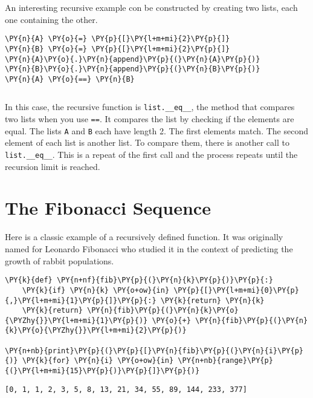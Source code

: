 An interesting recursive example con be constructed by creating two lists, each one containing the other.


\begin{Verbatim}[commandchars=\\\{\}]
\PY{n}{A} \PY{o}{=} \PY{p}{[}\PY{l+m+mi}{2}\PY{p}{]}
\PY{n}{B} \PY{o}{=} \PY{p}{[}\PY{l+m+mi}{2}\PY{p}{]}
\PY{n}{A}\PY{o}{.}\PY{n}{append}\PY{p}{(}\PY{n}{A}\PY{p}{)}
\PY{n}{B}\PY{o}{.}\PY{n}{append}\PY{p}{(}\PY{n}{B}\PY{p}{)}
\PY{n}{A} \PY{o}{==} \PY{n}{B}
\end{Verbatim}

\begin{Verbatim}
\end{Verbatim}


In this case, the recursive function is \texttt{list.\_\_eq\_\_}, the method that compares two lists when you use \texttt{==}.  It compares the list by checking if the elements are equal.  The lists \texttt{A} and \texttt{B} each have length 2.  The first elements match.  The second element of each list is another list.  To compare them, there is another call to \texttt{list.\_\_eq\_\_}.  This is a repeat of the first call and the process repeats until the recursion limit is reached.

\section{The Fibonacci Sequence}


Here is a classic example of a recursively defined function.
It was originally named for Leonardo Fibonacci who studied it in the context of predicting the growth of rabbit populations.


\begin{Verbatim}[commandchars=\\\{\}]
\PY{k}{def} \PY{n+nf}{fib}\PY{p}{(}\PY{n}{k}\PY{p}{)}\PY{p}{:}
    \PY{k}{if} \PY{n}{k} \PY{o+ow}{in} \PY{p}{[}\PY{l+m+mi}{0}\PY{p}{,}\PY{l+m+mi}{1}\PY{p}{]}\PY{p}{:} \PY{k}{return} \PY{n}{k}
    \PY{k}{return} \PY{n}{fib}\PY{p}{(}\PY{n}{k}\PY{o}{\PYZhy{}}\PY{l+m+mi}{1}\PY{p}{)} \PY{o}{+} \PY{n}{fib}\PY{p}{(}\PY{n}{k}\PY{o}{\PYZhy{}}\PY{l+m+mi}{2}\PY{p}{)}

\PY{n+nb}{print}\PY{p}{(}\PY{p}{[}\PY{n}{fib}\PY{p}{(}\PY{n}{i}\PY{p}{)} \PY{k}{for} \PY{n}{i} \PY{o+ow}{in} \PY{n+nb}{range}\PY{p}{(}\PY{l+m+mi}{15}\PY{p}{)}\PY{p}{]}\PY{p}{)}
\end{Verbatim}

\begin{Verbatim}
[0, 1, 1, 2, 3, 5, 8, 13, 21, 34, 55, 89, 144, 233, 377]
\end{Verbatim}


